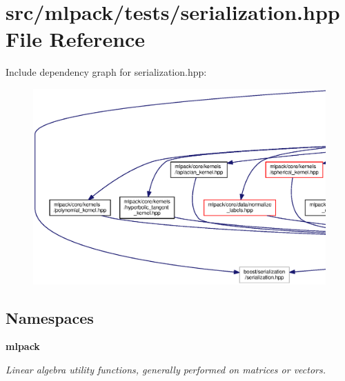 \section{src/mlpack/tests/serialization.hpp File Reference}
\label{serialization_8hpp}
Include dependency graph for serialization.\+hpp\+:
\nopagebreak
\begin{figure}[H]
\begin{center}
\leavevmode
\includegraphics[width=350pt]{serialization_8hpp__incl}
\end{center}
\end{figure}
\subsection*{Namespaces}
\begin{DoxyCompactItemize}
\item 
 {\bf mlpack}
\begin{DoxyCompactList}\small\item\em Linear algebra utility functions, generally performed on matrices or vectors. \end{DoxyCompactList}\end{DoxyCompactItemize}
